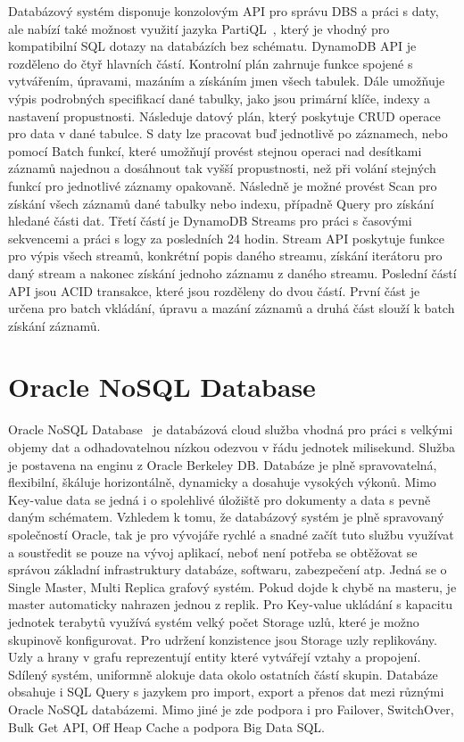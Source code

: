 \documentclass[czech,master,dept460,male,csharp,cpdeclaration]{diploma}
\begin{document}
	Databázový systém disponuje konzolovým API pro správu DBS a práci s daty, ale nabízí také možnost využití jazyka PartiQL~\cite{partiql}, který je vhodný pro kompatibilní SQL dotazy na databázích bez schématu. DynamoDB API je rozděleno do čtyř hlavních částí. Kontrolní plán zahrnuje funkce spojené s vytvářením, úpravami, mazáním a získáním jmen všech tabulek. Dále umožňuje výpis podrobných specifikací dané tabulky, jako jsou primární klíče, indexy a nastavení propustnosti. Následuje datový plán, který poskytuje CRUD operace pro data v dané tabulce. S daty lze pracovat buď jednotlivě po záznamech, nebo pomocí Batch funkcí, které umožňují provést stejnou operaci nad desítkami záznamů najednou a dosáhnout tak vyšší propustnosti, než při volání stejných funkcí pro jednotlivé záznamy opakovaně. Následně je možné provést Scan pro získání všech záznamů dané tabulky nebo indexu, případně Query pro získání hledané části dat. Třetí částí je DynamoDB Streams pro práci s časovými sekvencemi a práci s logy za posledních 24 hodin. Stream API poskytuje funkce pro výpis všech streamů, konkrétní popis daného streamu, získání iterátoru pro daný stream a nakonec získání jednoho záznamu z daného streamu. Poslední částí API jsou ACID transakce, které jsou rozděleny do dvou částí. První část je určena pro batch vkládání, úpravu a mazání záznamů a druhá část slouží k batch získání záznamů.
		
	\section{Oracle NoSQL Database}
	
	Oracle NoSQL Database~\cite{oraclenosqldb} je databázová cloud služba vhodná pro práci s velkými objemy dat a odhadovatelnou nízkou odezvou v řádu jednotek milisekund. Služba je postavena na enginu z Oracle Berkeley DB. Databáze je plně spravovatelná, flexibilní, škáluje horizontálně, dynamicky a dosahuje vysokých výkonů. Mimo Key-value data se jedná i o spolehlivé úložiště pro dokumenty a data s pevně daným schématem. Vzhledem k tomu, že databázový systém je plně spravovaný společností Oracle, tak je pro vývojáře rychlé a snadné začít tuto službu využívat a soustředit se pouze na vývoj aplikací, neboť není potřeba se obtěžovat se správou základní infrastruktury databáze, softwaru, zabezpečení atp. Jedná se o Single Master, Multi Replica grafový systém. Pokud dojde k chybě na masteru, je master automaticky nahrazen jednou z replik. Pro Key-value ukládání s kapacitu jednotek terabytů využívá systém velký počet Storage uzlů, které je možno skupinově konfigurovat. Pro udržení konzistence jsou Storage uzly replikovány. Uzly a hrany v grafu reprezentují entity které vytvářejí vztahy a propojení. Sdílený systém, uniformně alokuje data okolo ostatních částí skupin. Databáze obsahuje i SQL Query s jazykem pro import, export a přenos dat mezi různými Oracle NoSQL databázemi. Mimo jiné je zde podpora i pro Failover, SwitchOver, Bulk Get API, Off Heap Cache a podpora Big Data SQL.
	
\end{document}
